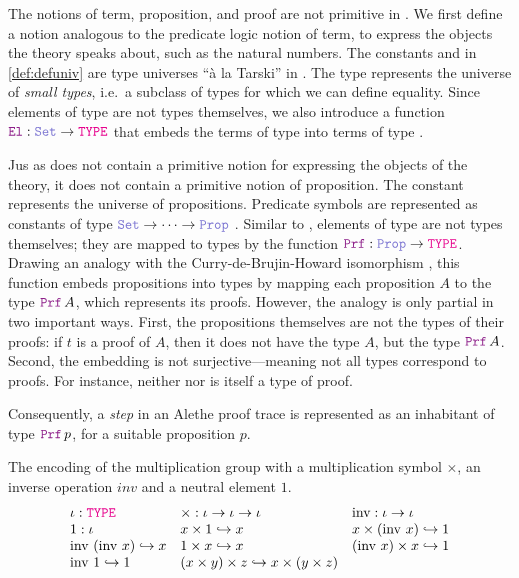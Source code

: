The notions of term, proposition, and proof are not primitive in \lpm.
We ﬁrst deﬁne a notion analogous to the predicate logic notion of term, to express the objects the theory speaks about, such as the natural numbers.
The constants \set{} and \prop{} in \cref{def:defuniv} are type universes ``à la Tarski'' \cite[\S Universes]{intuitype} in \lpm.
The type \set{} represents the universe of \textit{small types}, i.e.\ a subclass of types for which we can define equality.
Since elements of type \set{} are not types themselves,
we also introduce a function $\el: \set \rightarrow \type$ that embeds the terms of type \set{} into terms of type \type.

Jus as \lpm{} does not contain a primitive notion for expressing the objects of the theory, it does not contain a primitive notion of proposition.
The constant \prop{} represents the universe of propositions. Predicate symbols are represented as constants of type $\set{} \ra \dots \ra \prop$ .
Similar to \set{}, elements of type \prop{} are not types themselves; they are mapped to types by the function $\prf{}: \prop \rightarrow \type$.
Drawing an analogy with the Curry-de-Brujin-Howard isomorphism \cite{curryhoward}, this function embeds propositions into types by mapping each proposition $A$ to the type $\prf\,A$, which represents its proofs.
However, the analogy is only partial in two important ways. First, the propositions themselves are not the types of their proofs: if $t$ is a proof of $A$, then it does not have the type $A$,
but the type $\prf\,A$. Second, the embedding is not surjective—meaning not all types correspond to proofs. For instance, neither \set{} nor \prop{} is itself a type of proof.

Consequently, a \emph{step} in an Alethe proof trace is represented as an inhabitant of type $\prf{}\,p$, for a suitable proposition $p$.

\begin{example}
The encoding of the multiplication group with a multiplication symbol $\times$, an inverse operation $inv$ and a neutral element $1$.
\[
\begin{array}{lll}
\iota : \type & \times : \iota \to \iota \to \iota & \text{inv} : \iota \to \iota \\
1 : \iota & x \times 1 \re x & x \times (\text{inv } x) \re 1 \\
\text{inv } (\text{inv } x) \re x & 1 \times x \re x & (\text{inv } x) \times x \re 1 \\
\text{inv } 1 \re 1 & (x \times y) \times z \re x \times (y \times z) & \\
\end{array}
\]
\end{example}

